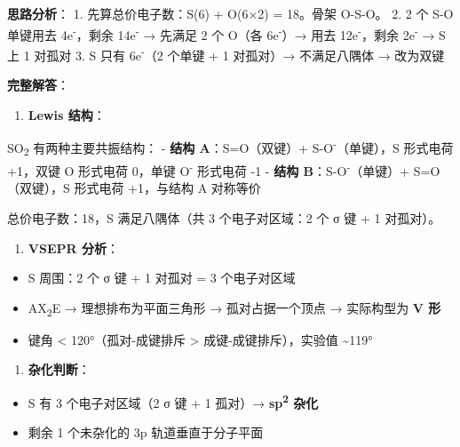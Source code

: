 \documentclass[a4paper,11pt]{ctexart}
\providecommand{\tightlist}{\setlength{\itemsep}{0pt}\setlength{\parskip}{0pt}}
\begin{document}
\textbf{思路分析}：
1. 先算总价电子数：S(6) + O(6×2) = 18。骨架 O-S-O。
2. 2 个 S-O 单键用去 4e\textsuperscript{-}，剩余 14e\textsuperscript{-} → 先满足 2 个 O（各 6e\textsuperscript{-}）→ 用去 12e\textsuperscript{-}，剩余 2e\textsuperscript{-} → S 上 1 对孤对
3. S 只有 6e\textsuperscript{-}（2 个单键 + 1 对孤对）→ 不满足八隅体 → 改为双键

\textbf{完整解答}：

\begin{enumerate}
\def\labelenumi{(\arabic{enumi})}
\tightlist
\item
  \textbf{Lewis 结构}：
\end{enumerate}

SO\textsubscript{2} 有两种主要共振结构：
- \textbf{结构 A}：S=O（双键）+ S-O\textsuperscript{-}（单键），S 形式电荷 +1，双键 O 形式电荷 0，单键 O\textsuperscript{-} 形式电荷 -1
- \textbf{结构 B}：S-O\textsuperscript{-}（单键）+ S=O（双键），S 形式电荷 +1，与结构 A 对称等价

总价电子数：18，S 满足八隅体（共 3 个电子对区域：2 个 σ 键 + 1 对孤对）。

\begin{enumerate}
\def\labelenumi{(\arabic{enumi})}
\setcounter{enumi}{1}
\tightlist
\item
  \textbf{VSEPR 分析}：
\end{enumerate}

\begin{itemize}
\tightlist
\item
  S 周围：2 个 σ 键 + 1 对孤对 = 3 个电子对区域
\item
  AX\textsubscript{2}E → 理想排布为平面三角形 → 孤对占据一个顶点 → 实际构型为 \textbf{V 形}
\item
  键角 \textless{} 120°（孤对-成键排斥 \textgreater{} 成键-成键排斥），实验值 \textasciitilde119°
\end{itemize}

\begin{enumerate}
\def\labelenumi{(\arabic{enumi})}
\setcounter{enumi}{2}
\tightlist
\item
  \textbf{杂化判断}：
\end{enumerate}

\begin{itemize}
\tightlist
\item
  S 有 3 个电子对区域（2 σ 键 + 1 孤对）→ \textbf{sp\textsuperscript{2} 杂化}
\item
  剩余 1 个未杂化的 3p 轨道垂直于分子平面
\end{itemize}
\end{document}

